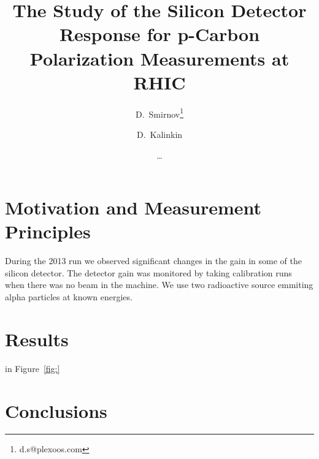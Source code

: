 \documentclass[12pt]{article}
\begin{document}
\title{The Study of the Silicon Detector Response for p-Carbon Polarization Measurements at RHIC}

\author[1]{D.~Smirnov\thanks{d.s@plexoos.com}}
\author[2]{D.~Kalinkin}
\author[]{\ldots}


\maketitle



\section{Motivation and Measurement Principles}

During the 2013 run we observed significant changes in the gain in some of the
silicon detector. The detector gain was monitored by taking calibration runs
when there was no beam in the machine. We use two radioactive source emmiting
alpha particles at known energies.


\section{Results}

in Figure~\ref{fig:}


\section{Conclusions}
\end{document}
